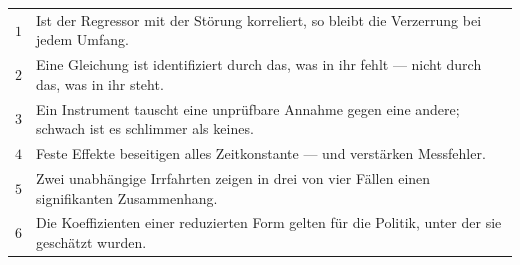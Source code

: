 \begin{merksatz}
\begin{center}
{\small
\renewcommand{\arraystretch}{1.55}
\begin{tabular}{@{}P{0.7cm}P{7.7cm}@{}}
\toprule
$1$ & Ist der Regressor mit der Störung korreliert, so bleibt die Verzerrung bei jedem Umfang.\\
$2$ & Eine Gleichung ist identifiziert durch das, was in ihr fehlt --- nicht durch das, was in ihr steht.\\
$3$ & Ein Instrument tauscht eine unprüfbare Annahme gegen eine andere; schwach ist es schlimmer als keines.\\
$4$ & Feste Effekte beseitigen alles Zeitkonstante --- und verstärken Messfehler.\\
$5$ & Zwei unabhängige Irrfahrten zeigen in drei von vier Fällen einen signifikanten Zusammenhang.\\
$6$ & Die Koeffizienten einer reduzierten Form gelten für die Politik, unter der sie geschätzt wurden.\\
\bottomrule
\end{tabular}}
\end{center}
\end{merksatz}

